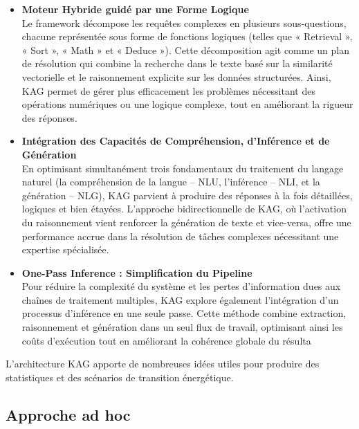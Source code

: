 \documentclass[a4paper,11pt]{report}
\providecommand{\tightlist}{\setlength{\itemsep}{0pt}\setlength{\parskip}{0pt}}
\begin{document}
\begin{itemize}
\tightlist
\item
  \textbf{Moteur Hybride guidé par une Forme Logique}\\
  Le framework décompose les requêtes complexes en plusieurs sous-questions, chacune représentée sous forme de fonctions logiques (telles que « Retrieval », « Sort », « Math » et « Deduce »). Cette décomposition agit comme un plan de résolution qui combine la recherche dans le texte basé sur la similarité vectorielle et le raisonnement explicite sur les données structurées. Ainsi, KAG permet de gérer plus efficacement les problèmes nécessitant des opérations numériques ou une logique complexe, tout en améliorant la rigueur des réponses.
\end{itemize}

\begin{itemize}
\tightlist
\item
  \textbf{Intégration des Capacités de Compréhension, d'Inférence et de Génération}\\
  En optimisant simultanément trois fondamentaux du traitement du langage naturel (la compréhension de la langue -- NLU, l'inférence -- NLI, et la génération -- NLG), KAG parvient à produire des réponses à la fois détaillées, logiques et bien étayées. L'approche bidirectionnelle de KAG, où l'activation du raisonnement vient renforcer la génération de texte et vice-versa, offre une performance accrue dans la résolution de tâches complexes nécessitant une expertise spécialisée.
\end{itemize}

\begin{itemize}
\tightlist
\item
  \textbf{One-Pass Inference : Simplification du Pipeline}\\
  Pour réduire la complexité du système et les pertes d'information dues aux chaînes de traitement multiples, KAG explore également l'intégration d'un processus d'inférence en une seule passe. Cette méthode combine extraction, raisonnement et génération dans un seul flux de travail, optimisant ainsi les coûts d'exécution tout en améliorant la cohérence globale du résulta
\end{itemize}

L'architecture KAG apporte de nombreuses idées utiles pour produire des statistiques et des scénarios de transition énergétique.

\subsection{Approche ad hoc}\label{approche-ad-hoc}
\end{document}
